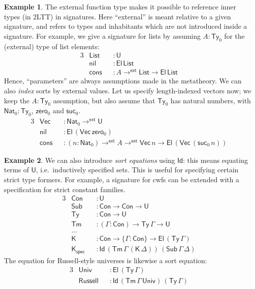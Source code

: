 \documentclass[12pt,a4paper,twoside,openany]{book}
\theoremstyle{remark}
\theoremstyle{definition}
\newtheorem{myexample}{Example}
\theoremstyle{theorem}
\newcommand{\ms}[1]{\mathsf{#1}}
\newcommand{\zero}{\ms{zero}}
\newcommand{\suc}{\ms{suc}}
\newcommand{\Ty}{\mathsf{Ty}}
\newcommand{\U}{\mathsf{U}}
\newcommand{\El}{\mathsf{El}}
\newcommand{\Id}{\mathsf{Id}}
\newcommand{\toe}{\to^{\ms{ext}}}
\newcommand{\Nat}{\ms{Nat}}
\begin{document}
\begin{myexample}
The external function type makes it possible to reference inner types (in 2LTT)
in signatures. Here ``external'' is meant relative to a given signature, and
refers to types and inhabitants which are not introduced inside a signature.
For example, we give a signature for lists by assuming $A : \Ty_0$ for the
(external) type of list elements:
\begin{alignat*}{3}
  &\ms{List} &&: \U\\
  &\ms{nil}  &&: \El\,\ms{List}\\
  &\ms{cons} &&: A \toe \ms{List} \to \El\,\ms{List}
\end{alignat*}
Hence, ``parameters'' are always assumptions made in the metatheory. We can
also \emph{index} sorts by external values. Let us specify length-indexed vectors
now; we keep the $A : \Ty_0$ assumption, but also assume that $\Ty_0$ has
natural numbers, with $\Nat_0 : \Ty_0$, $\zero_0$ and $\suc_0$.
\begin{alignat*}{3}
  &\ms{Vec}  &&: \Nat_0 \toe \U \\
  &\ms{nil}  &&: \El\,(\ms{Vec}\,\zero_0)\\
  &\ms{cons} &&: (n : \Nat_0) \toe A \toe \ms{Vec}\,n \to \El\,(\ms{Vec}\,(\suc_0\,n))
\end{alignat*}
\end{myexample}

\begin{myexample}
We can also introduce \emph{sort equations} using $\Id$: this means equating
terms of $\U$, i.e.\ inductively specified sets. This is useful for specifying
certain strict type formers. For example, a signature for cwfs can be extended with
a specification for strict constant families.
\begin{alignat*}{3}
  & \ms{Con}     &&: \U\\
  & \ms{Sub}     &&: \ms{Con} \to \ms{Con} \to \U \\
  & \ms{Ty}      &&: \ms{Con} \to \U\\
  & \ms{Tm}      &&: (\Gamma : \ms{Con}) \to \ms{Ty}\,\Gamma \to \U\\
  & ...          &&\\
  & \ms{K}       &&: \ms{Con} \to \{\Gamma : \ms{Con}\} \to \El\,(\ms{Ty}\,\Gamma)\\
  & \ms{K_{spec}} &&: \Id\,(\ms{Tm}\,\Gamma\,(\ms{K}\,\Delta))\,(\ms{Sub}\,\Gamma\,\Delta)
\end{alignat*}
The equation for Russell-style universes is likewise a sort equation:
\begin{alignat*}{3}
  &\ms{Univ}    &&: \El\,(\ms{Ty}\,\Gamma)\\
  &\ms{Russell} &&: \Id\,(\ms{Tm}\,\Gamma\,\ms{Univ})\,(\ms{Ty}\,\Gamma)
\end{alignat*}
\end{myexample}
\end{document}
